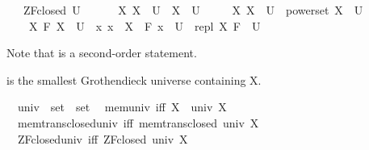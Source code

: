 \begin{isabellebody}
\ \ \ {\isachardoublequoteopen}ZF{\isacharunderscore}{\kern0pt}closed\ U\ {\isasymequiv}\ {\isacharparenleft}{\kern0pt}\isanewline
\ \ \ \ {\isacharparenleft}{\kern0pt}{\isasymforall}X{\isachardot}{\kern0pt}\ X\ {\isasymin}\ U\ {\isasymlongrightarrow}\ {\isasymUnion}X\ {\isasymin}\ U{\isacharparenright}{\kern0pt}\ {\isasymand}\isanewline
\ \ \ \ {\isacharparenleft}{\kern0pt}{\isasymforall}X{\isachardot}{\kern0pt}\ X\ {\isasymin}\ U\ {\isasymlongrightarrow}\ powerset\ X\ {\isasymin}\ U{\isacharparenright}{\kern0pt}\ {\isasymand}\isanewline
\ \ \ \ {\isacharparenleft}{\kern0pt}{\isasymforall}X\ F{\isachardot}{\kern0pt}\ X\ {\isasymin}\ U\ {\isasymlongrightarrow}\ {\isacharparenleft}{\kern0pt}{\isasymforall}x{\isachardot}{\kern0pt}\ x\ {\isasymin}\ X\ {\isasymlongrightarrow}\ F\ x\ {\isasymin}\ U{\isacharparenright}{\kern0pt}\ {\isasymlongrightarrow}\ repl\ X\ F\ {\isasymin}\ U{\isacharparenright}{\kern0pt}\isanewline
\ \ {\isacharparenright}{\kern0pt}{\isachardoublequoteclose}%
\begin{isamarkuptext}%
Note that  is a second-order statement.%
\end{isamarkuptext}\isamarkuptrue%
%
\begin{isamarkuptext}%
 is the smallest Grothendieck universe containing X.%
\end{isamarkuptext}\isamarkuptrue%
\isamarkupfalse%
\isanewline
\ \ univ\ {\isacharcolon}{\kern0pt}{\isacharcolon}{\kern0pt}\ {\isacartoucheopen}set\ {\isasymRightarrow}\ set{\isacartoucheclose}\isanewline
{}\isanewline
\ \ mem{\isacharunderscore}{\kern0pt}univ\ {\isacharbrackleft}{\kern0pt}iff{\isacharbrackright}{\kern0pt}{\isacharcolon}{\kern0pt}\ {\isachardoublequoteopen}X\ {\isasymin}\ univ\ X{\isachardoublequoteclose}\ \isanewline
\ \ mem{\isacharunderscore}{\kern0pt}trans{\isacharunderscore}{\kern0pt}closed{\isacharunderscore}{\kern0pt}univ\ {\isacharbrackleft}{\kern0pt}iff{\isacharbrackright}{\kern0pt}{\isacharcolon}{\kern0pt}\ {\isachardoublequoteopen}mem{\isacharunderscore}{\kern0pt}trans{\isacharunderscore}{\kern0pt}closed\ {\isacharparenleft}{\kern0pt}univ\ X{\isacharparenright}{\kern0pt}{\isachardoublequoteclose}\ \isanewline
\ \ ZF{\isacharunderscore}{\kern0pt}closed{\isacharunderscore}{\kern0pt}univ\ {\isacharbrackleft}{\kern0pt}iff{\isacharbrackright}{\kern0pt}{\isacharcolon}{\kern0pt}\ {\isachardoublequoteopen}ZF{\isacharunderscore}{\kern0pt}closed\ {\isacharparenleft}{\kern0pt}univ\ X{\isacharparenright}{\kern0pt}{\isachardoublequoteclose}\ \isanewline

\end{isabellebody}
